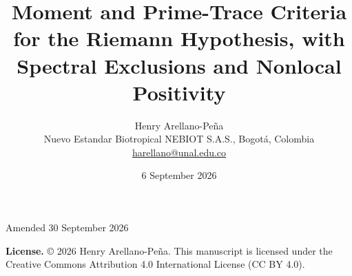 \documentclass[11pt,letterpaper]{article}
\title{\textbf{Moment and Prime-Trace Criteria for the Riemann Hypothesis, with Spectral Exclusions and Nonlocal Positivity}}
\author{Henry Arellano-Pe\~na\\
\small Nuevo Estandar Biotropical NEBIOT S.A.S., Bogot\'a, Colombia\\
\small \href{mailto:harellano@unal.edu.co}{harellano@unal.edu.co}}
\date{6 September 2026}
\numberwithin{equation}{section}
\theoremstyle{definition}
\theoremstyle{remark}
\begin{document}
\maketitle
\begin{center}\small Amended 30 September 2026\end{center}


\noindent\textbf{License.} © 2026 Henry Arellano-Peña. This manuscript is licensed under the Creative Commons Attribution 4.0 International License (CC BY 4.0).

\vspace{1.5em}
\end{document}

